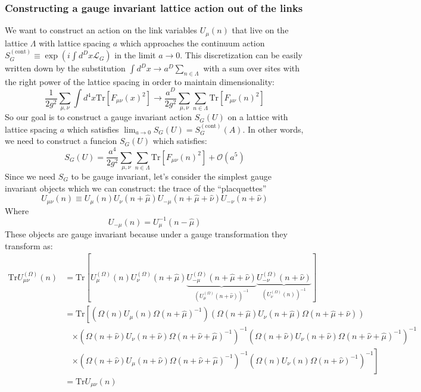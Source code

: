 \documentclass[11pt]{article}
\begin{document}
\subsubsection{Constructing a gauge invariant lattice action out of the links}

We want to construct an action on the link variables $U_\mu(n)$ that live on the lattice $\Lambda$ with lattice spacing $a$ which approaches the continuum action $S_G^{(\mathrm{cont})}\equiv \exp(i\int d^D x \mathcal L_G)$ in the limit $a\to 0$. This discretization can be easily written down by the substitution $\int d^D x\to a^D\sum_{n\in\Lambda}$ with a sum over sites with the right power of the lattice spacing in order to maintain dimensionality:
\begin{equation}\label{eq:S_G_cont}\frac{1}{2g^2}\sum_{\mu,\nu}\int d^4 x \mathrm{Tr}\left[F_{\mu\nu}(x)^2\right]\to \frac{a^D}{2g^2}\sum_{\mu,\nu}\sum_{n\in\Lambda} \mathrm{Tr}\left[F_{\mu\nu}(n)^2\right]\end{equation}
So our goal is to construct a gauge invariant action $S_G(U)$ on a lattice with lattice spacing $a$ which satisfies $\lim_{a\to0}S_G(U)=S_G^{(\mathrm{cont})}(A)$. In other words, we need to construct a funcion $S_G(U)$ which satisfies:
\begin{equation}\label{eq:desired_S_G}S_G(U)=\frac{a^4}{2g^2}\sum_{\mu,\nu}\sum_{n\in\Lambda} \mathrm{Tr}[F_{\mu\nu}(n)^2]+\mathcal O(a^5)\end{equation}
Since we need $S_G$ to be gauge invariant, let's consider the simplest gauge invariant objects which we can construct: the trace of the ``placquettes''
\begin{equation}\label{eq:placquettes}U_{\mu\nu}(n)\equiv U_\mu(n)U_\nu(n+\hat\mu)U_{-\mu}(n+\hat\mu+\hat\nu)U_{-\nu}(n+\hat\nu)\end{equation}
Where 
\begin{equation}U_{-\mu}(n)=U^{-1}_{\mu}(n-\hat\mu)\end{equation}
These objects are gauge invariant because under a gauge transformation they transform as:
\begin{align*}\mathrm{Tr}U_{\mu\nu}^{(\Omega)}(n)
&=\mathrm{Tr}[U^{(\Omega)}_\mu(n)U^{(\Omega)}_\nu(n+\hat\mu)\underbrace{U^{(\Omega)}_{-\mu}(n+\hat\mu+\hat\nu)}_{\left(U^{(\Omega)}_{\mu}(n+\hat\nu)\right)^{-1}}\underbrace{U^{(\Omega)}_{-\nu}(n+\hat\nu)}_{\left(U^{(\Omega)}_{\nu}(n)\right)^{-1}}]\\
&=\mathrm{Tr}\left[(\Omega(n)U_\mu(n)\Omega(n+\hat\mu)^{-1})(\Omega(n+\hat\mu)U_\nu(n+\hat\mu)\Omega(n+\hat\mu+\hat\nu))\right.\\&\ \ \ \ 
\left.\times (\Omega(n+\hat\nu)U_\nu(n+\hat\nu)\Omega(n+\hat\nu+\hat\mu)^{-1})^{-1}(\Omega(n+\hat\nu)U_\nu(n+\hat\nu)\Omega(n+\hat\nu+\hat\mu)^{-1})^{-1}\right.\\&\ \ \ \ \left.\times(\Omega(n+\hat\nu)U_\mu(n+\hat\nu)\Omega(n+\hat\nu+\hat\mu)^{-1})^{-1}(\Omega(n)U_\nu(n)\Omega(n+\hat\nu)^{-1})^{-1}\right]\\&=\mathrm{Tr}U_{\mu\nu}(n)\end{align*}
\end{document}
